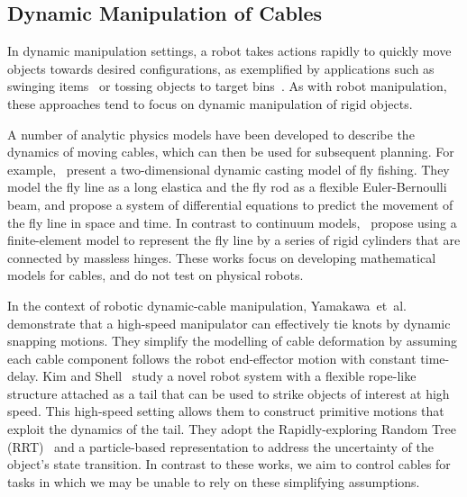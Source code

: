 \documentclass[letterpaper, 10 pt, conference]{ieeeconf}  %
\begin{document}
\subsection{Dynamic Manipulation of Cables}

In dynamic manipulation settings, a robot takes actions rapidly to quickly move objects towards desired configurations, as exemplified by applications such as swinging items~\cite{swingbot_2020,diabolo_2020} or tossing objects to target bins~\cite{zeng_tossing_2019}. As with robot manipulation, these approaches tend to focus on dynamic manipulation of rigid objects.

A number of analytic physics models have been developed to describe the dynamics of moving cables, which can then be used for subsequent planning. For example,~\cite{fly_fishing_2004} present a two-dimensional dynamic casting model of fly fishing. They model the fly line as a long elastica and the fly rod as a flexible Euler-Bernoulli beam, and propose a system of differential equations to predict the movement of the fly line in space and time. 
In contrast to continuum models,~\cite{wang2011analysis} propose using a finite-element model to represent the fly line by a series of rigid cylinders that are connected by massless hinges. These works focus on developing mathematical models for cables, and do not test on physical robots.

In the context of robotic dynamic-cable manipulation,
Yamakawa~et~al.~\cite{dynamic_knotting_2010,yamakawa2012simple,high_speed_knotting_2013,one_hand_knotting_tactile_2007} demonstrate that a high-speed manipulator can effectively tie knots by dynamic snapping motions. They simplify the modelling of cable deformation by assuming each cable component follows the robot end-effector motion with constant time-delay. Kim and Shell~\cite{kim2016using} study a novel robot system with a flexible rope-like structure attached as a tail that can be used to strike objects of interest at high speed. This high-speed setting allows them to construct primitive motions that exploit the dynamics of the tail. They adopt the Rapidly-exploring Random Tree (RRT)~\cite{RRT_2001} and a particle-based representation to address the uncertainty of the object’s state transition. In contrast to these works, we aim to control cables for tasks in which we may be unable to rely on these simplifying assumptions.
\end{document}
